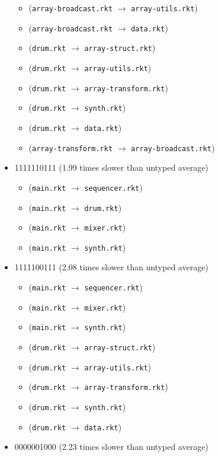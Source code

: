 \documentclass{article}
\newcommand{\mono}[1]{\texttt{#1}}
\begin{document}
\begin{itemize}
\begin{itemize}
  \item (\mono{array-broadcast.rkt} $\rightarrow$ \mono{array-utils.rkt})
  \item (\mono{array-broadcast.rkt} $\rightarrow$ \mono{data.rkt})
  \item (\mono{drum.rkt} $\rightarrow$ \mono{array-struct.rkt})
  \item (\mono{drum.rkt} $\rightarrow$ \mono{array-utils.rkt})
  \item (\mono{drum.rkt} $\rightarrow$ \mono{array-transform.rkt})
  \item (\mono{drum.rkt} $\rightarrow$ \mono{synth.rkt})
  \item (\mono{drum.rkt} $\rightarrow$ \mono{data.rkt})
  \item (\mono{array-transform.rkt} $\rightarrow$ \mono{array-broadcast.rkt})
  \end{itemize}
\item 1111110111 (1.99 times slower than untyped average)
  \begin{itemize}
  \item (\mono{main.rkt} $\rightarrow$ \mono{sequencer.rkt})
  \item (\mono{main.rkt} $\rightarrow$ \mono{drum.rkt})
  \item (\mono{main.rkt} $\rightarrow$ \mono{mixer.rkt})
  \item (\mono{main.rkt} $\rightarrow$ \mono{synth.rkt})
  \end{itemize}
\item 1111100111 (2.08 times slower than untyped average)
  \begin{itemize}
  \item (\mono{main.rkt} $\rightarrow$ \mono{sequencer.rkt})
  \item (\mono{main.rkt} $\rightarrow$ \mono{mixer.rkt})
  \item (\mono{main.rkt} $\rightarrow$ \mono{synth.rkt})
  \item (\mono{drum.rkt} $\rightarrow$ \mono{array-struct.rkt})
  \item (\mono{drum.rkt} $\rightarrow$ \mono{array-utils.rkt})
  \item (\mono{drum.rkt} $\rightarrow$ \mono{array-transform.rkt})
  \item (\mono{drum.rkt} $\rightarrow$ \mono{synth.rkt})
  \item (\mono{drum.rkt} $\rightarrow$ \mono{data.rkt})
  \end{itemize}
\item 0000001000 (2.23 times slower than untyped average)

\end{itemize}
\end{document}

